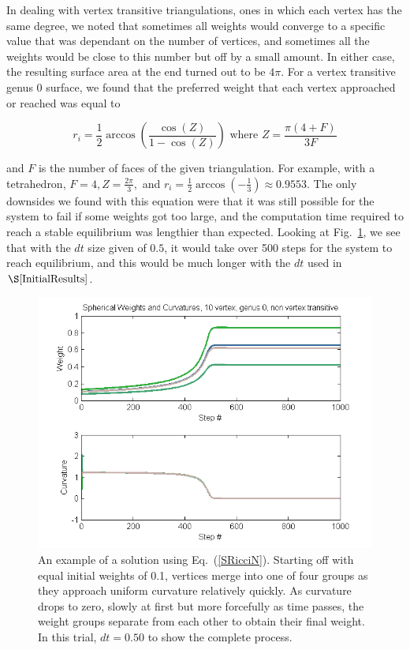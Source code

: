 \documentclass[12pt]{article}
\begin{document}
\noindent In dealing with vertex transitive triangulations, ones in which each vertex has the same degree, we noted that sometimes all weights would converge to a specific value that was dependant on the number of vertices, and sometimes all the weights would be close to this number but off by a small amount. In either case, the resulting surface area at the end turned out to be $4\pi$. For a vertex transitive genus 0 surface, we found that the preferred weight that each vertex approached or reached was equal to 

$$r_i = \frac{1}{2}\arccos(\frac{\cos(Z)}{1 - \cos(Z)}) \mbox{ where } Z = \frac{\pi(4 + F)}{3F}$$

\noindent and $F$ is the number of faces of the given triangulation. For example, with a tetrahedron, $F = 4, Z = \frac{2\pi}{3},$ and $r_i = \frac{1}{2}\arccos(-\frac{1}{3}) \approx 0.9553.$ The only downsides we found with this equation were that it was still possible for the system to fail if some weights got too large, and the computation time required to reach a stable equilibrium was lengthier than expected. Looking at Fig.~\ref{SphGood}, we see that with the $dt$ size given of $0.5$, it would take over 500 steps for the system to reach equilibrium, and this would be much longer with the $dt$ used in $\S\ref{InitialResults}$.  

\begin{figure}[ht]
\centering
\includegraphics[scale = 0.8]{Pictures/SphG0V10.png}
\caption{An example of a solution using Eq.~(\ref{SRicciN}). Starting off with equal initial weights of 0.1, vertices merge into one of four groups as they approach uniform curvature relatively quickly. As curvature drops to zero, slowly at first but more forcefully as time passes, the weight groups separate from each other to obtain their final weight. In this trial, $dt = 0.50$ to show the complete process.}
\label{SphGood}  
\end{figure}
\end{document}
